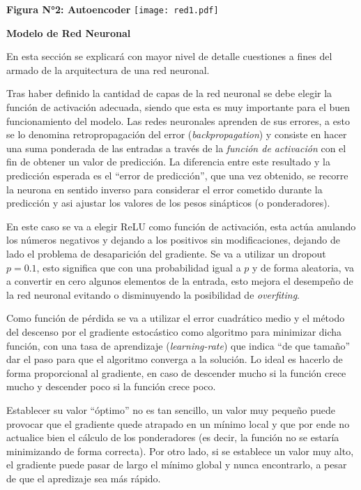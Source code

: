 \documentclass[12pt,a4paper]{article}
\begin{document}
\begin{multicols}{2}
\begin{center}
\textbf{Figura N°2: Autoencoder}
\texttt{[image: red1.pdf]}
\end{center}

\begin{center}
\begin{large}
\textbf{Modelo de Red Neuronal}
\end{large}
\end{center}

En esta sección se explicará con mayor nivel de detalle cuestiones a fines del armado de la arquitectura de una red neuronal.

Tras haber definido la cantidad de capas de la red neuronal se debe elegir la función de activación adecuada, siendo que esta es muy importante para el buen funcionamiento del modelo. Las redes neuronales aprenden de sus errores, a esto se lo denomina retropropagación del error (\textit{backpropagation}) y consiste en hacer una suma ponderada de las entradas a través de la \textit{función de activación} con el fin de obtener un valor de predicción. La diferencia entre este resultado y la predicción esperada es el ``error de predicción'', que una vez obtenido, se recorre la neurona en sentido inverso para considerar el error cometido durante la predicción y asi ajustar los valores de los pesos sinápticos (o ponderadores). 

En este caso se va a elegir ReLU como función de activación, esta actúa anulando los números negativos y dejando a los positivos sin modificaciones, dejando de lado el problema de desaparición del gradiente. Se va a utilizar un dropout $p = 0.1$, esto significa que con una probabilidad igual a $p$ y de forma aleatoria, va a convertir en cero algunos elementos de la entrada,  esto mejora el desempeño de la red neuronal evitando o disminuyendo la posibilidad de \textit{overfiting}. 

Como función de pérdida se va a utilizar el error cuadrático medio y el método del descenso por el gradiente estocástico como algoritmo para minimizar dicha función, con una tasa de aprendizaje (\textit{learning-rate}) que indica ``de que tamaño'' dar el paso para que el algoritmo converga a la solución. Lo ideal es hacerlo de forma proporcional al gradiente, en caso de descender mucho si la función crece mucho y descender poco si la función crece poco.

Establecer su valor ``óptimo'' no es tan sencillo, un valor muy pequeño puede provocar que el gradiente quede atrapado en un mínimo local y que por ende no actualice bien el cálculo de los ponderadores (es decir, la función no se estaría minimizando de forma correcta). Por otro lado, si se establece un valor muy alto, el gradiente puede pasar de largo el mínimo global y nunca encontrarlo, a pesar de que el apredizaje sea más rápido. 


\end{multicols}
\end{document}
